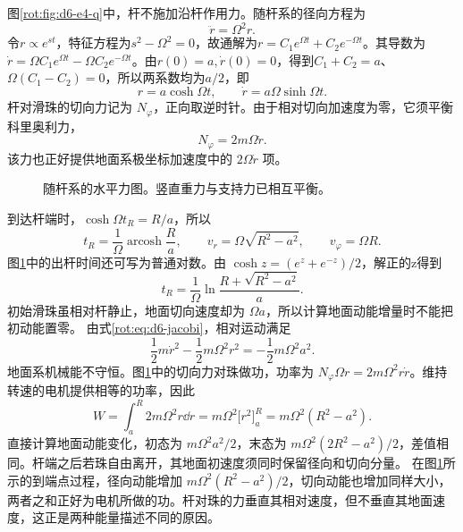\begin{solution}
图\ref{rot:fig:d6-e4-q}中，杆不施加沿杆作用力。随杆系的径向方程为
\[
\ddot r=\Omega^2r.
\]
令$r\propto e^{st}$，特征方程为$s^2-\Omega^2=0$，故通解为$r=C_1e^{\Omega t}+C_2e^{-\Omega t}$。其导数为$\dot r=\Omega C_1e^{\Omega t}-\Omega C_2e^{-\Omega t}$。由$r(0)=a,\dot r(0)=0$，得到$C_1+C_2=a$、$\Omega(C_1-C_2)=0$，所以两系数均为$a/2$，即
\[
r=a\cosh\Omega t,\qquad
\dot r=a\Omega\sinh\Omega t.
\]
杆对滑珠的切向力记为 $N_\varphi$，正向取逆时针。由于相对切向加速度为零，它须平衡科里奥利力，
\[
N_\varphi=2m\Omega\dot r.
\]
该力也正好提供地面系极坐标加速度中的 $2\Omega\dot r$ 项。
\begin{figure}[H]\centering
{}
\caption{随杆系的水平力图。竖直重力与支持力已相互平衡。}\label{rot:fig:d6-e4-s}
\end{figure}
到达杆端时，$\cosh\Omega t_R=R/a$，所以
\[
t_R=\frac1\Omega\operatorname{arcosh}\frac Ra,\qquad
v_r=\Omega\sqrt{R^2-a^2},\qquad v_\varphi=\Omega R.
\]
图\ref{rot:fig:d6-e4-s}中的出杆时间还可写为普通对数。由 $\cosh z=(e^z+e^{-z})/2$，解正的z得到
\[
t_R=\frac1\Omega\ln\frac{R+\sqrt{R^2-a^2}}a.
\]
初始滑珠虽相对杆静止，地面切向速度却为 $\Omega a$，所以计算地面动能增量时不能把初动能置零。
由式\eqref{rot:eq:d6-jacobi}，相对运动满足
\[
\frac12m\dot r^2-\frac12m\Omega^2r^2=-\frac12m\Omega^2a^2.
\]
地面系机械能不守恒。图\ref{rot:fig:d6-e4-s}中的切向力对珠做功，功率为
$N_\varphi\Omega r=2m\Omega^2r\dot r$。维持转速的电机提供相等的功率，因此
\[
W=\int_a^R2m\Omega^2r\dd r
=m\Omega^2\bigl[r^2\bigr]_a^R=m\Omega^2(R^2-a^2).
\]
直接计算地面动能变化，初态为 $m\Omega^2a^2/2$，末态为 $m\Omega^2(2R^2-a^2)/2$，差值相同。杆端之后若珠自由离开，其地面初速度须同时保留径向和切向分量。
在图\ref{rot:fig:d6-e4-s}所示的到端点过程，径向动能增加 $m\Omega^2(R^2-a^2)/2$，切向动能也增加同样大小，两者之和正好为电机所做的功。杆对珠的力垂直其相对速度，但不垂直其地面速度，这正是两种能量描述不同的原因。
\end{solution}



